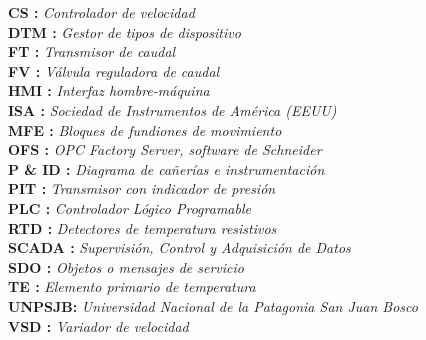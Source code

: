\noindent %
\textbf{CS :} \textit{Controlador de velocidad}\\
\textbf{DTM :} \textit{Gestor de tipos de dispositivo}\\
\textbf{FT :} \textit{Transmisor de caudal}\\
\textbf{FV :} \textit{Válvula reguladora de caudal}\\
\textbf{HMI :} \textit{Interfaz hombre-máquina}\\
\textbf{ISA :} \textit{Sociedad de Instrumentos de América (EEUU)}\\
\textbf{MFE :} \textit{Bloques de fundiones de movimiento}\\
\textbf{OFS :} \textit{OPC Factory Server, software de Schneider}\\
\textbf{P \& ID :} \textit{Diagrama de cañerías e instrumentación}\\
\textbf{PIT :} \textit{Transmisor con indicador de presión}\\
\textbf{PLC :} \textit{Controlador Lógico Programable}\\
\textbf{RTD :} \textit{Detectores de temperatura resistivos}\\
\textbf{SCADA :} \textit{Supervisión, Control y Adquisición de Datos}\\ %
\textbf{SDO :} \textit{Objetos o mensajes de servicio}\\
\textbf{TE :} \textit{Elemento primario de temperatura}\\
\textbf{UNPSJB:} \textit{Universidad Nacional de la Patagonia San Juan Bosco}\\
\textbf{VSD :} \textit{Variador de velocidad}\\

\newpage